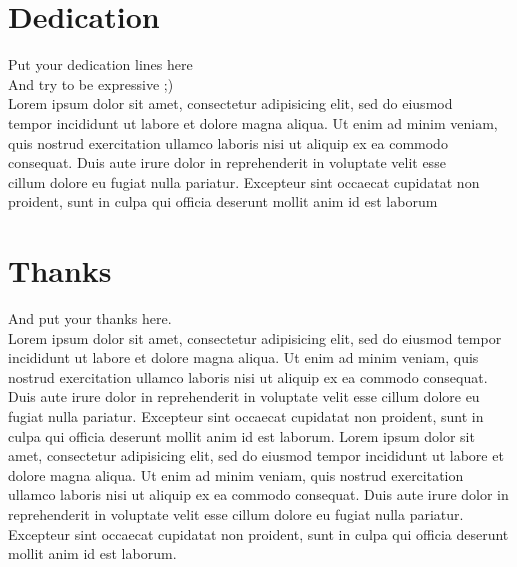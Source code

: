 
\chapter*{Dedication}
\thispagestyle{empty}
%
\begin{center}
  Put your dedication lines here ~\\
  And try to be expressive ;) ~\\


  Lorem ipsum dolor sit amet, consectetur adipisicing elit, sed do eiusmod ~\\
  tempor incididunt ut labore et dolore magna aliqua. Ut enim ad minim veniam, ~\\
  quis nostrud exercitation ullamco laboris nisi ut aliquip ex ea commodo ~\\
  consequat. Duis aute irure dolor in reprehenderit in voluptate velit esse ~\\
  cillum dolore eu fugiat nulla pariatur. Excepteur sint occaecat cupidatat non ~\\
  proident, sunt in culpa qui officia deserunt mollit anim id est laborum ~\\
\end{center}
%
%
%
%
%
%
%
\cleardoublepage%
\chapter*{Thanks}
\thispagestyle{empty}
%
And put your thanks here. ~\\

Lorem ipsum dolor sit amet, consectetur adipisicing elit, sed do eiusmod
tempor incididunt ut labore et dolore magna aliqua. Ut enim ad minim veniam,
quis nostrud exercitation ullamco laboris nisi ut aliquip ex ea commodo
consequat. Duis aute irure dolor in reprehenderit in voluptate velit esse
cillum dolore eu fugiat nulla pariatur. Excepteur sint occaecat cupidatat non
proident, sunt in culpa qui officia deserunt mollit anim id est laborum. Lorem ipsum dolor sit amet, consectetur adipisicing elit, sed do eiusmod
tempor incididunt ut labore et dolore magna aliqua. Ut enim ad minim veniam,
quis nostrud exercitation ullamco laboris nisi ut aliquip ex ea commodo
consequat. Duis aute irure dolor in reprehenderit in voluptate velit esse
cillum dolore eu fugiat nulla pariatur. Excepteur sint occaecat cupidatat non
proident, sunt in culpa qui officia deserunt mollit anim id est laborum.